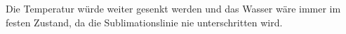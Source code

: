 Die Temperatur würde weiter gesenkt werden und das Wasser wäre immer im festen Zustand, da die Sublimationslinie nie unterschritten wird.